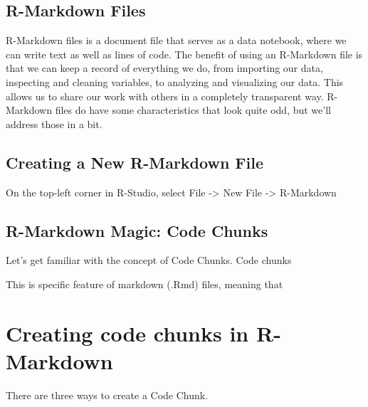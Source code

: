 \documentclass[
]{book}
\begin{document}
\hypertarget{r-markdown-files}{%
\subsection{R-Markdown Files}\label{r-markdown-files}}

R-Markdown files is a document file that serves as a data notebook, where we can write text as well as lines of code. The benefit of using an R-Markdown file is that we can keep a record of everything we do, from importing our data, inspecting and cleaning variables, to analyzing and visualizing our data. This allows us to share our work with others in a completely transparent way. R-Markdown files do have some characteristics that look quite odd, but we'll address those in a bit.

\hypertarget{creating-a-new-r-markdown-file}{%
\subsection{Creating a New R-Markdown File}\label{creating-a-new-r-markdown-file}}

On the top-left corner in R-Studio, select File -\textgreater{} New File -\textgreater{} R-Markdown

\hypertarget{r-markdown-magic-code-chunks}{%
\subsection{R-Markdown Magic: Code Chunks}\label{r-markdown-magic-code-chunks}}

Let's get familiar with the concept of Code Chunks. Code chunks

This is specific feature of markdown (.Rmd) files, meaning that

\hypertarget{creating-code-chunks-in-r-markdown}{%
\section{Creating code chunks in R-Markdown}\label{creating-code-chunks-in-r-markdown}}

There are three ways to create a Code Chunk.
\end{document}
